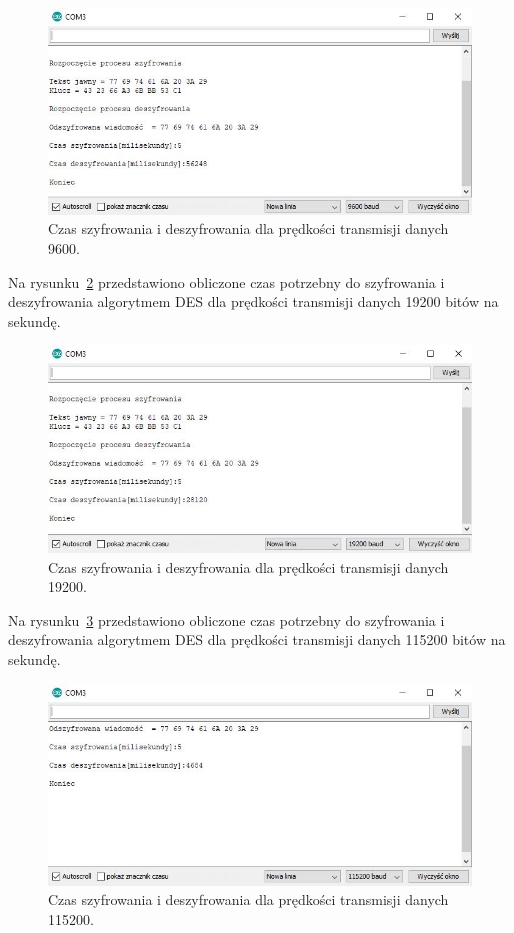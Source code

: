 \documentclass[12p]{article}
\begin{document}
\begin{figure}[H]
\centering
\includegraphics[width=12cm]{szy_desz_9600.jpg}
\caption{Czas szyfrowania i deszyfrowania dla prędkości transmisji danych 9600.}\label{9600}
\end{figure}

Na rysunku~\ref{19200} przedstawiono obliczone czas potrzebny do szyfrowania i deszyfrowania algorytmem DES dla prędkości transmisji danych 19200 bitów na sekundę.

\begin{figure}[H]
\centering
\includegraphics[width=12cm]{szy_desz_19200.jpg}
\caption{Czas szyfrowania i deszyfrowania dla prędkości transmisji danych 19200.}\label{19200}
\end{figure}

Na rysunku~\ref{115200} przedstawiono obliczone czas potrzebny do szyfrowania i deszyfrowania algorytmem DES dla prędkości transmisji danych 115200 bitów na sekundę.

\begin{figure}[H]
\centering
\includegraphics[width=12cm]{szy_desz_115200.jpg}
\caption{Czas szyfrowania i deszyfrowania dla prędkości transmisji danych 115200.}\label{115200}
\end{figure}
\end{document}
